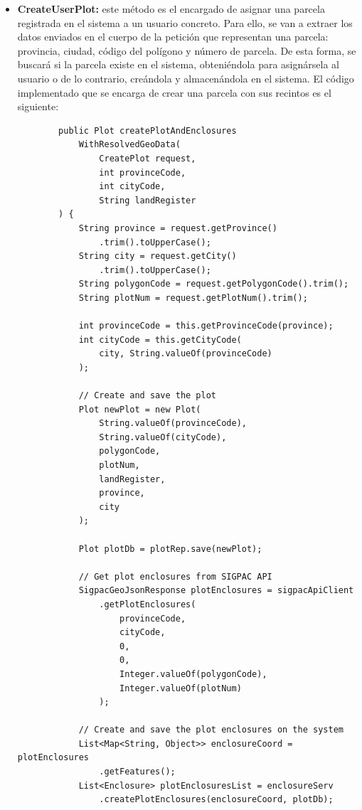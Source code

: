 \begin{itemize}
    \item \textbf{CreateUserPlot:} este método es el encargado de asignar una parcela registrada en el sistema a un usuario concreto. Para ello, se van a extraer los datos enviados en el
    cuerpo de la petición que representan una parcela: provincia, ciudad, código del polígono y número de parcela. De esta forma, se buscará si la parcela existe en el sistema, obteniéndola
    para asignársela al usuario o de lo contrario, creándola y almacenándola en el sistema. El código implementado que se encarga de crear una parcela con sus recintos es el siguiente:

    \begin{verbatim}
        public Plot createPlotAndEnclosures
            WithResolvedGeoData(
                CreatePlot request,
                int provinceCode,
                int cityCode,
                String landRegister
        ) {
            String province = request.getProvince()
                .trim().toUpperCase();
            String city = request.getCity()
                .trim().toUpperCase();
            String polygonCode = request.getPolygonCode().trim();
            String plotNum = request.getPlotNum().trim();

            int provinceCode = this.getProvinceCode(province);
            int cityCode = this.getCityCode(
                city, String.valueOf(provinceCode)
            );

            // Create and save the plot
            Plot newPlot = new Plot(
                String.valueOf(provinceCode),
                String.valueOf(cityCode), 
                polygonCode, 
                plotNum, 
                landRegister,
                province,
                city
            );

            Plot plotDb = plotRep.save(newPlot);

            // Get plot enclosures from SIGPAC API
            SigpacGeoJsonResponse plotEnclosures = sigpacApiClient
                .getPlotEnclosures(
                    provinceCode, 
                    cityCode,
                    0, 
                    0, 
                    Integer.valueOf(polygonCode), 
                    Integer.valueOf(plotNum)
                );

            // Create and save the plot enclosures on the system
            List<Map<String, Object>> enclosureCoord = plotEnclosures
                .getFeatures();
            List<Enclosure> plotEnclosuresList = enclosureServ
                .createPlotEnclosures(enclosureCoord, plotDb);
            

\end{verbatim}
\end{itemize}
